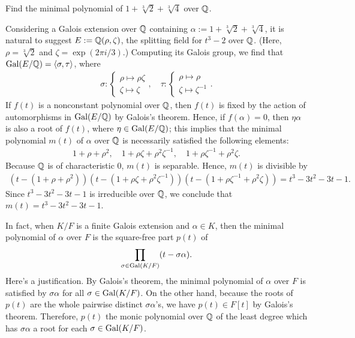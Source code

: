 \begin{prob}
    Find the minimal polynomial of $1+\sqrt[3]{2}+\sqrt[3]{4}$ over ${\mathbb{Q}}$.
\end{prob}
\begin{sol}
    Considering a Galois extension over ${\mathbb{Q}}$ containing $\alpha:=1+\sqrt[3]{2}+\sqrt[3]{4}$, it is natural to suggest $E:={\mathbb{Q}}(\rho, \zeta)$, the splitting field for $t^3-2$ over ${\mathbb{Q}}$. (Here, $\rho=\sqrt[3]{2}$ and $\zeta=\exp(2\pi i/3)$.)
    Computing its Galois group, we find that ${\textrm{Gal}({E/{\mathbb{Q}}})}={\left\langle{\sigma, \tau}\right\rangle}$, where
    \begin{align*}
        \sigma:\left\{\begin{array}{c}
            \rho\mapsto\rho\zeta\\
            \zeta\mapsto\zeta
        \end{array}\right.,\quad
        \tau:\left\{\begin{array}{c}
            \rho\mapsto\rho\\
            \zeta\mapsto\zeta^{-1}
        \end{array}\right..
    \end{align*}
    If $f(t)$ is a nonconstant polynomial over ${\mathbb{Q}}$, then $f(t)$ is fixed by the action of automorphisms in ${\textrm{Gal}({E/{\mathbb{Q}}})}$ by Galois's theorem.
    Hence, if $f(\alpha)=0$, then $\eta\alpha$ is also a root of $f(t)$, where $\eta\in{\textrm{Gal}({E/{\mathbb{Q}}})}$; this implies that the minimal polynomial $m(t)$ of $\alpha$ over ${\mathbb{Q}}$ is necessarily satisfied the following elements:
    \begin{align*}
        1+\rho+\rho^2,\quad 1+\rho\zeta+\rho^2\zeta^{-1},\quad 1+\rho\zeta^{-1}+\rho^2\zeta.
    \end{align*}
    Because ${\mathbb{Q}}$ is of characteristic 0, $m(t)$ is separable.
    Hence, $m(t)$ is divisible by
    \begin{align*}
        (t-(1+\rho+\rho^2))(t-(1+\rho\zeta+\rho^2\zeta^{-1}))(t-(1+\rho\zeta^{-1}+\rho^2\zeta))=t^3-3t^2-3t-1.
    \end{align*}
    Since $t^3-3t^2-3t-1$ is irreducible over ${\mathbb{Q}}$, we conclude that $m(t)=t^3-3t^2-3t-1$.
\end{sol}
\begin{rmk}
    In fact, when $K/F$ is a finite Galois extension and $\alpha\in K$, then the minimal polynomial of $\alpha$ over $F$ is the square-free part $p(t)$ of
    \begin{align*}
        \prod_{\sigma\in{\textrm{Gal}({K/F})}}(t-\sigma\alpha).
    \end{align*}
    Here's a justification.
    By Galois's theorem, the minimal polynomial of $\alpha$ over $F$ is satisfied by $\sigma\alpha$ for all $\sigma\in{\textrm{Gal}({K/F})}$.
    On the other hand, because the roots of $p(t)$ are the whole pairwise distinct $\sigma\alpha$'s, we have $p(t)\in F[t]$ by Galois's theorem.
    Therefore, $p(t)$ the monic polynomial over ${\mathbb{Q}}$ of the least degree which has $\sigma\alpha$ a root for each $\sigma\in{\textrm{Gal}({K/F})}$.
\end{rmk}

